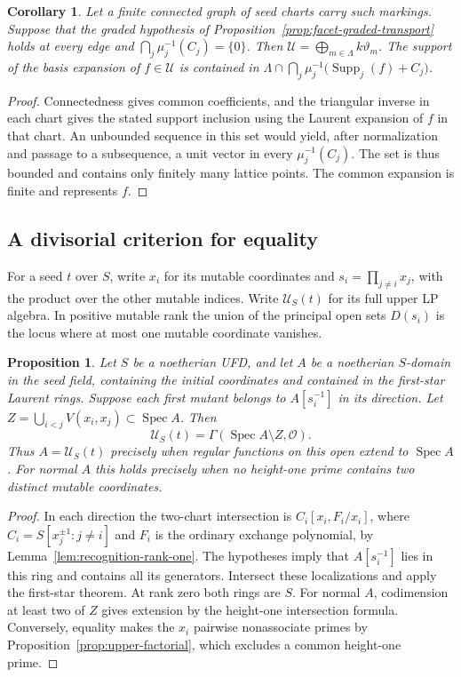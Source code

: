 \documentclass[11pt,reqno]{amsart}
\numberwithin{equation}{section}
\newtheorem{proposition}[theorem]{Proposition}
\newtheorem{corollary}[theorem]{Corollary}
\theoremstyle{definition}
\theoremstyle{remark}
\DeclareMathOperator{\Supp}{Supp}
\DeclareMathOperator{\Spec}{Spec}
\begin{document}
\begin{corollary}\label{cor:facet-graded-spanning}
Let a finite connected graph of seed charts carry such
markings. Suppose that the graded hypothesis of
Proposition~\ref{prop:facet-graded-transport} holds at every edge
and \(\bigcap_j\mu_j^{-1}(C_j)=\{0\}\). Then
\(\mathcal U=\bigoplus_{m\in\Lambda}k\vartheta_m\). The support of
the basis expansion of \(f\in\mathcal U\) is contained in
\(\Lambda\cap\bigcap_j\mu_j^{-1}\bigl(\Supp_j(f)+C_j\bigr)\).
\end{corollary}
\begin{proof}
Connectedness gives common coefficients, and the triangular inverse
in each chart gives the stated support inclusion using the Laurent
expansion of \(f\) in that chart. An unbounded sequence in this set
would yield, after normalization and passage to a subsequence, a
unit vector in every \(\mu_j^{-1}(C_j)\). The set is thus bounded
and contains only finitely many lattice points. The common expansion
is finite and represents \(f\).
\end{proof}

\subsection{A divisorial criterion for equality}\label{subsec:divisorial}

For a seed \(t\) over \(S\), write \(x_i\) for its mutable coordinates
and \(s_i=\prod_{j\ne i}x_j\), with the product over the other mutable
indices. Write \(\mathcal U_S(t)\) for its full upper LP algebra.
In positive mutable rank the union of the principal open sets
\(D(s_i)\) is the locus where at most one mutable coordinate vanishes.

\begin{proposition}\label{prop:star-divisors}
Let \(S\) be a noetherian UFD, and let \(A\) be a noetherian
\(S\)-domain in the seed field, containing the initial coordinates and
contained in the first-star Laurent rings. Suppose each first mutant
belongs to \(A[s_i^{-1}]\) in its direction. Let
\(Z=\bigcup_{i<j}V(x_i,x_j)\subset\Spec A\). Then
\[ \mathcal U_S(t)=\Gamma(\Spec A\setminus Z,\mathcal O). \]
Thus \(A=\mathcal U_S(t)\) precisely when regular functions on this
open extend to \(\Spec A\). For normal \(A\) this holds precisely when
no height-one prime contains two distinct mutable coordinates.
\end{proposition}
\begin{proof}
In each direction the two-chart intersection is
\(C_i[x_i,F_i/x_i]\), where \(C_i=S[x_j^{\pm1}:j\ne i]\) and
\(F_i\) is the ordinary exchange polynomial, by Lemma~\ref{lem:recognition-rank-one}.
The hypotheses imply that \(A[s_i^{-1}]\) lies in this ring and contains all
its generators. Intersect these localizations and apply the first-star
theorem. At rank zero both rings are \(S\).
For normal \(A\), codimension at least two of \(Z\) gives extension
by the height-one intersection formula. Conversely, equality makes
the \(x_i\) pairwise nonassociate primes by
Proposition~\ref{prop:upper-factorial}, which excludes a common
height-one prime.
\end{proof}
\end{document}
